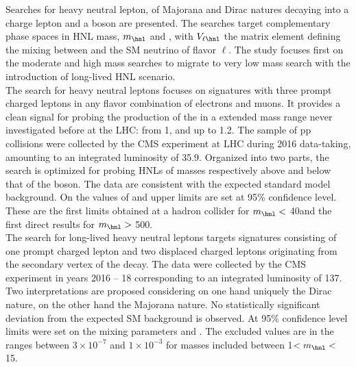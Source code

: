 
\begin{extraAbstract}

Searches for heavy neutral lepton, \hnl of Majorana and Dirac natures
decaying into a charge lepton and a \PW boson are presented.
The searches target complementary phase spaces in HNL mass, $m_\hnl$
and \mixpar, with $V_{\ell \hnl}$ the matrix element
defining the mixing between \hnl and the SM neutrino of flavor $\ell$.
The study focuses first on the
moderate and high mass searches to migrate to very low mass search with
the introduction of long-lived HNL scenario.\\

The search for heavy neutral leptons focuses on signatures with three
prompt charged leptons in any flavor combination of electrons and
muons. It provides a clean signal for probing the production of the
\hnl in a extended mass range never investigated before at the LHC:
from 1\GeV, and up to 1.2\TeV. The sample of pp collisions were
collected by the CMS experiment at LHC during 2016 data-taking, amounting to
an integrated luminosity of 35.9\fbinv. 
Organized into two parts, the search is optimized for
probing HNLs of masses respectively above and below that of the \PW boson. 
The data are consistent with the expected standard model
background. On the values of \mixparm and \mixpare upper limits are
set at 95\% confidence level. 
These are the first limits obtained at a hadron collider for
 $m_\hnl <$ 40\GeV and the first direct results for $m_\hnl >$
 500\GeV.\\

The search for long-lived heavy neutral leptons targets signatures
consisting of one prompt charged lepton and two displaced
charged leptons originating from the secondary vertex of the \hnl decay.
The data were collected by the
CMS experiment in years 2016 -- 18 corresponding to an integrated
luminosity of 137\fbinv. Two interpretations are proposed considering
on one hand uniquely the \hnl
Dirac nature, on the other hand the \hnl Majorana nature. 
No statistically significant deviation from the expected
SM background is observed. At 95\% confidence level limits were set on the mixing
parameters \mixpare and \mixparm. The excluded values are in the
ranges between $3\times 10^{-7}$ and $1\times 10^{-3}$ for masses included
between 1\GeV $< m_\hnl <$ 15\GeV. 


























\end{extraAbstract}
